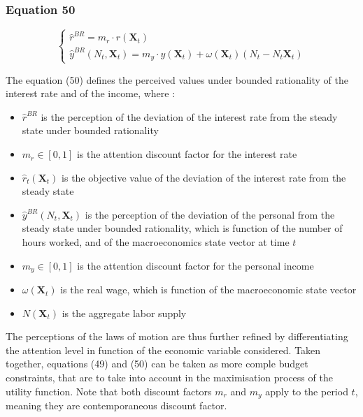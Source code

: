 \documentclass{article}
\begin{document}
\subsubsection*{Equation 50}

\begin{equation}\tag{50}
    \begin{cases}
        \hat{r}^{BR} = m_{r}\cdot\hat{r}(\textbf{X}_{t}) \\
        \hat{y}^{BR}(N_{t},\textbf{X}_{t}) = m_{y}\cdot\hat{y}(\textbf{X}_{t})+\omega(\textbf{X}_{t})(N_{t}-N_{t}\textbf{X}_{t})
    \end{cases}
\end{equation}

The equation (50) defines the perceived values under bounded rationality of the interest rate and of the income, where : 
\begin{itemize}
    \item $\hat{r}^{BR}$ is the perception of the deviation of the interest rate from the steady state under bounded rationality
    \item $m_{r}\in\left[0,1\right]$ is the attention discount factor for the interest rate
    \item $\hat{r}_{t}(\textbf{X}_{t})$ is the objective value of the deviation of the interest rate from the steady state 
    
    \item $\hat{y}^{BR}(N_{t},\textbf{X}_{t})$ is the perception of the deviation of the personal from the steady state under bounded rationality, which is function of the number of hours worked, and of the macroeconomics state vector at time $t$
    \item $m_{y}\in\left[0,1\right]$ is the attention discount factor for the personal income
    \item $\omega(\textbf{X}_{t})$ is the real wage, which is function of the macroeconomic state vector
    \item $N(\textbf{X}_{t})$ is the aggregate labor supply
\end{itemize}
The perceptions of the laws of motion are thus further refined by differentiating the attention level in function of the economic variable considered. 
Taken together, equations (49) and (50) can be taken as more comple budget constraints, that are to take into account in the maximisation process of the utility function.
Note that both discount factors $m_{r}$ and $m_{y}$ apply to the period $t$, meaning they are contemporaneous discount factor. 
\end{document}
